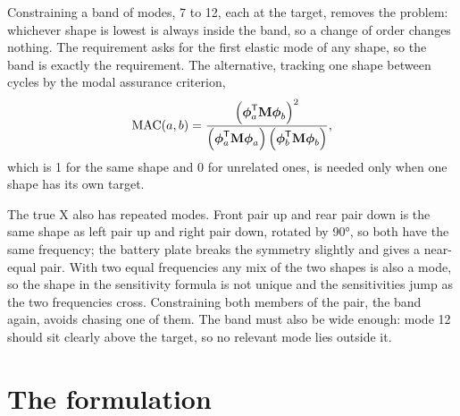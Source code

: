 Constraining a band of modes, 7 to 12, each at the target, removes the problem: whichever shape is lowest is always inside the band, so a change of order changes nothing. The requirement asks for the first elastic mode of any shape, so the band is exactly the requirement. The alternative, tracking one shape between cycles by the modal assurance criterion,
\begin{equation}
\text{MAC}(a,b) = \frac{\left(\boldsymbol{\phi}_a^{\mathsf{T}}\mathbf{M}\boldsymbol{\phi}_b\right)^2}{\left(\boldsymbol{\phi}_a^{\mathsf{T}}\mathbf{M}\boldsymbol{\phi}_a\right)\left(\boldsymbol{\phi}_b^{\mathsf{T}}\mathbf{M}\boldsymbol{\phi}_b\right)},
\end{equation}
which is 1 for the same shape and 0 for unrelated ones, is needed only when one shape has its own target.

The true X also has repeated modes. Front pair up and rear pair down is the same shape as left pair up and right pair down, rotated by \ang{90}, so both have the same frequency; the battery plate breaks the symmetry slightly and gives a near-equal pair. With two equal frequencies any mix of the two shapes is also a mode, so the shape in the sensitivity formula is not unique and the sensitivities jump as the two frequencies cross. Constraining both members of the pair, the band again, avoids chasing one of them. The band must also be wide enough: mode 12 should sit clearly above the target, so no relevant mode lies outside it.

\section{The formulation}\label{sec:to-formulation}

